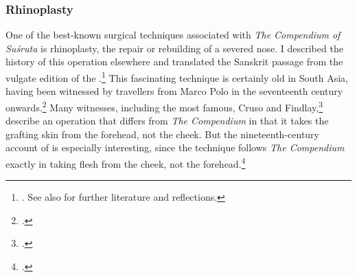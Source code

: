 

\subsubsection{Rhinoplasty}
\label{sec:rhinoplasty}

One of the best-known surgical techniques associated with \emph{The 
Compendium of
    Suśruta} is rhinoplasty, the repair or rebuilding of a severed nose. I described
the history of this operation elsewhere and translated the Sanskrit passage from
the vulgate edition of the \SS.\footnote{\cite[67--70, 99--100]{wuja-2003}. See
also \cite[IB, 327--328, note 186]{meul-hist} for further literature and
reflections.}  This fascinating technique is certainly old in South Asia, having
been witnessed by travellers from Marco Polo in the seventeenth century
onwards.\footcite[ii.301]{manu-stor} Many witnesses, including the most famous,
Cruso and Findlay,\footcite[883, 891\,f.]{cowasjee} describe an operation that
differs from \emph{The Compendium} in that it takes the grafting skin from the
forehead, not the cheek.  But the nineteenth-century account of
\citeauthor{thor-bann} is especially interesting, since the technique follows
\emph{The Compendium} exactly in taking flesh from the cheek, not the
forehead.\footcite[352--3]{thor-bann}

